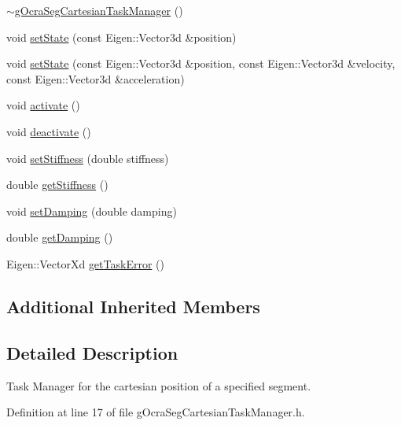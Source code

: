 \begin{DoxyCompactItemize}
\item 
\hyperlink{classgocra_1_1gOcraSegCartesianTaskManager_a859cbd42a2beb4eff0e68ee014d9009f}{$\sim$g\+Ocra\+Seg\+Cartesian\+Task\+Manager} ()
\item 
void \hyperlink{classgocra_1_1gOcraSegCartesianTaskManager_ab10bcbbedc2c7a0fb1d97067e33bd2d7}{set\+State} (const Eigen\+::\+Vector3d \&position)
\item 
void \hyperlink{classgocra_1_1gOcraSegCartesianTaskManager_a32f465f4fd6dbb427296557d681b736e}{set\+State} (const Eigen\+::\+Vector3d \&position, const Eigen\+::\+Vector3d \&velocity, const Eigen\+::\+Vector3d \&acceleration)
\item 
void \hyperlink{classgocra_1_1gOcraSegCartesianTaskManager_ad10f6192fd628de724bd923770bd632e}{activate} ()
\item 
void \hyperlink{classgocra_1_1gOcraSegCartesianTaskManager_a0d74a81a6ba05ccbd509aa3362ae59aa}{deactivate} ()
\item 
void \hyperlink{classgocra_1_1gOcraSegCartesianTaskManager_ac5f2b4e56649e16d87955c21ae2fd46f}{set\+Stiffness} (double stiffness)
\item 
double \hyperlink{classgocra_1_1gOcraSegCartesianTaskManager_ab94deae9c9d90f78bf706d7bdc2fe5cb}{get\+Stiffness} ()
\item 
void \hyperlink{classgocra_1_1gOcraSegCartesianTaskManager_a96d208274095c39ddcdb0861290168ab}{set\+Damping} (double damping)
\item 
double \hyperlink{classgocra_1_1gOcraSegCartesianTaskManager_a67ab6c84e7b6739b777f53bf31c88fb1}{get\+Damping} ()
\item 
Eigen\+::\+Vector\+Xd \hyperlink{classgocra_1_1gOcraSegCartesianTaskManager_a12418bbcfafcc5f7aab8b6f8013880a4}{get\+Task\+Error} ()
\end{DoxyCompactItemize}
\subsection*{Additional Inherited Members}


\subsection{Detailed Description}
Task Manager for the cartesian position of a specified segment. 



Definition at line 17 of file g\+Ocra\+Seg\+Cartesian\+Task\+Manager.\+h.



